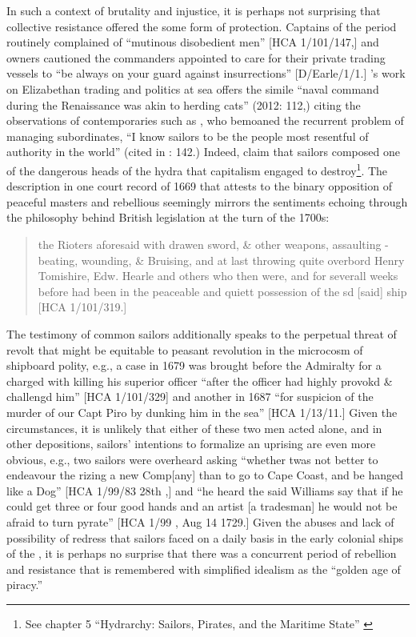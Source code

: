   In such a context of brutality and injustice, it is perhaps not surprising that collective resistance offered the  some form of protection. Captains of the period routinely complained of “mutinous disobedient men” [HCA 1/101/147,] and owners cautioned the commanders appointed to care for their private trading vessels to “be always on your guard against insurrections” [D/Earle/1/1.] ’s work on Elizabethan trading and politics at sea offers the simile “naval command during the Renaissance was akin to herding cats” (2012: 112,) citing the observations of contemporaries such as , who bemoaned the recurrent problem of managing subordinates, “I know sailors to be the people most resentful of authority in the world” (cited in \citealt{Bicheno2012}: 142.) Indeed, \citet{LinebaughRediker2000} claim that sailors composed one of the dangerous heads of the hydra that capitalism engaged to destroy\footnote{See chapter 5 “Hydrarchy: Sailors, Pirates, and the Maritime State” \citet[143--173]{LinebaughRediker}}. The description in one court record of 1669 that attests to the binary opposition of peaceful masters and rebellious  seemingly mirrors the sentiments echoing through the philosophy behind British legislation at the turn of the 1700s:

\begin{quotation}
the Rioters aforesaid with drawen sword, \& other weapons, assaulting - beating, wounding, \& Bruising, and at last throwing quite overbord Henry Tomishire, Edw. Hearle and others who then were, and for severall weeks before had been in the peaceable and quiett possession of the sd [said] ship [HCA 1/101/319.] 
\end{quotation}

The testimony of common sailors additionally speaks to the perpetual threat of revolt that might be equitable to peasant revolution in the microcosm of shipboard polity, e.g., a case in 1679 was brought before the Admiralty for a  charged with killing his superior officer “after the officer had highly provokd \& challengd him” [HCA 1/101/329] and another in 1687 “for suspicion of the murder of our Capt Piro by dunking him in the sea” [HCA 1/13/11.] Given the circumstances, it is unlikely that either of these two men acted alone, and in other depositions, sailors’ intentions to formalize an uprising are even more obvious, e.g., two sailors were overheard asking “whether twas not better to endeavour the rizing a new Comp[any] than to go to Cape Coast, and be hanged like a Dog” [HCA 1/99/83 28th \citealt{March1722},] and “he heard the said Williams say that if he could get three or four good hands and an artist [a tradesman] he would not be afraid to turn pyrate” [HCA 1/99 , Aug 14 1729.] Given the abuses and lack of possibility of redress that sailors faced on a daily basis in the early colonial ships of the , it is perhaps no surprise that there was a concurrent period of rebellion and resistance that is remembered with simplified idealism as the “golden age of piracy.”

